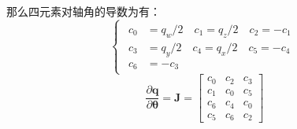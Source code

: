 \documentclass[12pt, onecolumn]{article}
\begin{document}
	那么四元素对轴角的导数为有：
	\begin{equation*}
		\begin{cases}
		\begin{aligned}
			c_0&=q_w/2\quad c_1=q_z/2 \quad c_2=-c_1\\
			c_3&=q_y/2\quad c_4=q_x/2 \quad c_5=-c_4\\
			c_6&=-c_3
		\end{aligned}
		\end{cases}
	\end{equation*}
	\begin{equation*}
	\frac{\partial \boldsymbol{q}}{\partial\boldsymbol{ \theta}}=\boldsymbol{J}=\begin{bmatrix}
	c_0&c_2&c_3\\c_1&c_0&c_5\\c_6&c_4&c_0\\c_5&c_6&c_2
	\end{bmatrix}
	\end{equation*}
	
	
	
	
	
	
	
	
	
	
	
	
	
	
	
	
	
	
	
\end{document}
